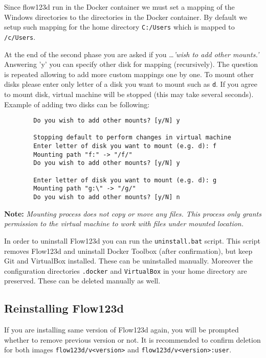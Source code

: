 \documentclass[12pt,a4paper]{report}
\begin{document}
\begin{enumerate}
	Since flow123d run in the Docker container we must set a mapping of the Windows directories to the directories in the Docker container. 
	By default we setup such mapping for the home directory \verb'C:/Users' which is mapped to \verb'/c/Users'. 
	
	At the end of the second phase you are asked if you \dots \emph{'wish to add other mounts.'} Answering 'y' you can specify other disk for mapping 
	(recursively). The question is repeated allowing to add more custom mappings one by one. To mount other disks please enter only letter 
	of a disk you want to mount such as \verb'd'.
	If you agree to mount disk, virtual machine will be stopped 
	(this may take several seconds). Example of adding two disks can be following:
	\begin{verbatim}
		Do you wish to add other mounts? [y/N] y
		
		Stopping default to perform changes in virtual machine
		Enter letter of disk you want to mount (e.g. d): f
		Mounting path "f:" -> "/f/"
		Do you wish to add other mounts? [y/N] y
		
		Enter letter of disk you want to mount (e.g. d): g
		Mounting path "g:\" -> "/g/"
		Do you wish to add other mounts? [y/N] n
	\end{verbatim}
	
	\textbf{Note:}
	\textit{Mounting process does not copy or move any files. This process only grants permission to the virtual machine to work with files under mounted location.}
\end{enumerate}

In order to uninstall Flow123d you can run the \verb'uninstall.bat' script. This script removes Flow123d 
and uninstall Docker Toolbox (after confirmation), but keep Git and VirtualBox installed. These can be uninstalled manually. 
Moreover the configuration directories \verb'.docker' and \verb'VirtualBox' in your home directory are preserved. These can be deleted manually as well. 




\subsection{Reinstalling Flow123d}
\label{duplicit-image}
If you are installing same version of Flow123d again, you will be prompted whether to remove previous version or not. 
It is recommended to confirm deletion for both images \verb'flow123d/v<version>' and \verb'flow123d/v<version>:user'.
\end{document}
